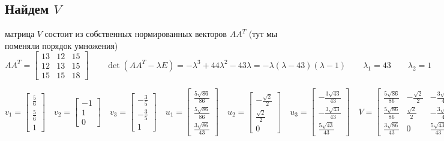 \documentclass{article}
\begin{document}
  \subsection{Найдем $V$}
  матрица $V$ состоит из собственных нормированных векторов $AA^T$ (тут мы поменяли порядок умножения)
  $$ AA^T = \left[\begin{matrix}13 & 12 & 15\\12 & 13 & 15\\15 & 15 & 18\end{matrix}\right] \qquad
  \det(AA^T - \lambda E) = - \lambda^{3} + 44 \lambda^{2} - 43 \lambda = - \lambda \left(\lambda - 43\right) \left(\lambda - 1\right) \qquad
  \lambda_1 = 43 \qquad
  \lambda_2 = 1 \qquad
  \lambda_3 = 0
  $$

  $$
  v_1 = \left[\begin{matrix}\frac{5}{6}\\\frac{5}{6}\\1\end{matrix}\right] \quad
  v_2 = \left[\begin{matrix}-1\\1\\0\end{matrix}\right] \quad
  v_3 = \left[\begin{matrix}- \frac{3}{5}\\- \frac{3}{5}\\1\end{matrix}\right] \quad
  u_1 = \left[\begin{matrix}\frac{5 \sqrt{86}}{86}\\\frac{5 \sqrt{86}}{86}\\\frac{3 \sqrt{86}}{43}\end{matrix}\right] \quad
  u_2 = \left[\begin{matrix}- \frac{\sqrt{2}}{2}\\\frac{\sqrt{2}}{2}\\0\end{matrix}\right] \quad
  u_3 = \left[\begin{matrix}- \frac{3 \sqrt{43}}{43}\\- \frac{3 \sqrt{43}}{43}\\\frac{5 \sqrt{43}}{43}\end{matrix}\right] \quad
  V = \left[\begin{matrix}\frac{5 \sqrt{86}}{86} & - \frac{\sqrt{2}}{2} & - \frac{3 \sqrt{43}}{43}\\\frac{5 \sqrt{86}}{86} & \frac{\sqrt{2}}{2} & - \frac{3 \sqrt{43}}{43}\\\frac{3 \sqrt{86}}{43} & 0 & \frac{5 \sqrt{43}}{43}\end{matrix}\right]
  $$
\end{document}
